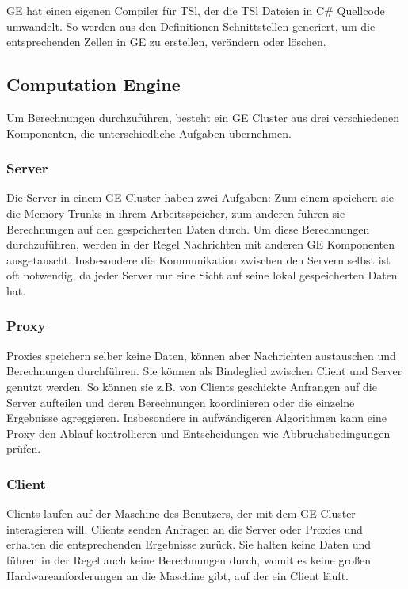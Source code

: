 GE hat einen eigenen Compiler für TSl, der die TSl Dateien in C\# Quellcode umwandelt. So werden aus den Definitionen Schnittstellen
generiert, um die entsprechenden Zellen in GE zu erstellen, verändern oder löschen. 

\subsection{Computation Engine}

Um Berechnungen durchzuführen, besteht ein GE Cluster aus drei verschiedenen Komponenten, die unterschiedliche Aufgaben übernehmen.


\subsubsection{Server}

Die Server in einem GE Cluster haben zwei Aufgaben: Zum einem speichern sie die Memory Trunks in ihrem Arbeitsspeicher, 
zum anderen führen sie Berechnungen auf den gespeicherten Daten durch.
Um diese Berechnungen durchzuführen, werden in der Regel Nachrichten mit anderen GE Komponenten ausgetauscht. Insbesondere die Kommunikation zwischen den Servern
selbst ist oft notwendig, da jeder Server nur eine Sicht auf seine lokal gespeicherten Daten hat.

\subsubsection{Proxy}

Proxies speichern selber keine Daten, können aber Nachrichten austauschen und Berechnungen durchführen. Sie können als 
Bindeglied zwischen Client und Server genutzt werden. So können sie z.B. von Clients geschickte Anfrangen auf die Server aufteilen und deren
Berechnungen koordinieren oder die einzelne Ergebnisse agreggieren. Insbesondere in aufwändigeren Algorithmen kann eine Proxy 
den Ablauf kontrollieren und Entscheidungen wie Abbruchsbedingungen prüfen.

\subsubsection{Client}

Clients laufen auf der Maschine des Benutzers, der mit dem GE Cluster interagieren will. Clients senden Anfragen an die Server oder Proxies und
erhalten die entsprechenden Ergebnisse zurück. Sie halten keine Daten und führen in der Regel auch keine Berechnungen durch, womit es keine großen Hardwareanforderungen
an die Maschine gibt, auf der ein Client läuft.

